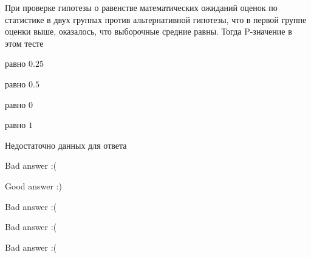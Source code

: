 
\begin{question}
При проверке гипотезы о равенстве математических ожиданий оценок по
статистике в двух группах против альтернативной гипотезы, что в первой
группе оценки выше, оказалось, что выборочные средние равны. Тогда
P-значение в этом тесте
\begin{answerlist}
  \item равно \(0.25\)
  \item равно \(0.5\)
  \item равно \(0\)
  \item равно \(1\)
  \item Недостаточно данных для ответа
\end{answerlist}
\end{question}

\begin{solution}
\begin{answerlist}
  \item Bad answer :(
  \item Good answer :)
  \item Bad answer :(
  \item Bad answer :(
  \item Bad answer :(
\end{answerlist}
\end{solution}


